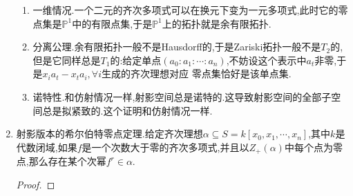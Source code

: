 \begin{enumerate}
\begin{enumerate}
    	\item 一维情况.一个二元的齐次多项式可以在换元下变为一元多项式,此时它的零点集是$\mathbb{P}^1$中的有限点集,于是$\mathbb{P}^1$上的拓扑就是余有限拓扑.
    	\item 分离公理.余有限拓扑一般不是Hausdorff的,于是Zariski拓扑一般不是$T_2$的,但是它同样总是$T_1$的:给定单点$(a_0:a_1:\cdots:a_n)$,不妨设这个表示中$a_t$非零,于是$x_ia_t-x_ta_i,\forall i$生成的齐次理想对应 零点集恰好是该单点集.
    	\item 诺特性.和仿射情况一样,射影空间总是诺特的.这导致射影空间的全部子空间总是拟紧致的.这个证明和仿射情况一样.
    \end{enumerate}
    \item 射影版本的希尔伯特零点定理.给定齐次理想$\alpha\subseteq S=k[x_0,x_1,\cdots,x_n]$,其中$k$是代数闭域,如果$f$是一个次数大于零的齐次多项式,并且以$Z_+(\alpha)$中每个点为零点,那么存在某个次幂$f^r\in\alpha$.
    \begin{proof}
    	

\end{proof}
\end{enumerate}
